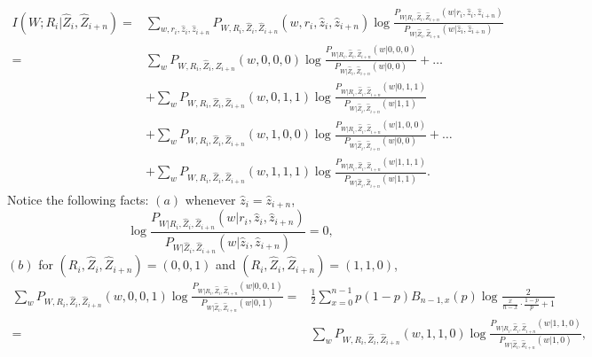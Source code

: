 \documentclass[onecolumn,romanappendices,10pt]{IEEEtran}
\begin{document}
	\begin{equation}
		\begin{aligned}
			I\left( W; R_i | \hat{Z}_{i}, \hat{Z}_{i+n} \right) =& \sum_{w, r_i, \hat{z}_{i}, \hat{z}_{i+n}} P_{W, R_i, \hat{Z}_{i}, \hat{Z}_{i+n}}(w, r_i, \hat{z}_{i}, \hat{z}_{i+n}) \log \frac{P_{W | R_i, \hat{Z}_{i}, \hat{Z}_{i+n}}(w | r_i, \hat{z}_{i}, \hat{z}_{i+n})}{P_{W | \hat{Z}_{i}, \hat{Z}_{i+n}}(w | \hat{z}_{i}, \hat{z}_{i+n})} \\
			=& \sum_{w} P_{W, R_i, \hat{Z}_{i}, \hat{Z}_{i+n}}(w, 0, 0, 0) \log \frac{P_{W | R_i, \hat{Z}_{i}, \hat{Z}_{i+n}}(w | 0, 0, 0)}{P_{W | \hat{Z}_{i}, \hat{Z}_{i+n}}(w | 0, 0)} + \ldots \\
			& + \sum_{w} P_{W, R_i, \hat{Z}_{i}, \hat{Z}_{i+n}}(w, 0, 1, 1) \log \frac{P_{W | R_i, \hat{Z}_{i}, \hat{Z}_{i+n}}(w | 0, 1, 1)}{P_{W | \hat{Z}_{i}, \hat{Z}_{i+n}}(w | 1, 1)} \\
			& + \sum_{w} P_{W, R_i, \hat{Z}_{i}, \hat{Z}_{i+n}}(w, 1, 0, 0) \log \frac{P_{W | R_i, \hat{Z}_{i}, \hat{Z}_{i+n}}(w | 1, 0, 0)}{P_{W | \hat{Z}_{i}, \hat{Z}_{i+n}}(w | 0, 0)} + \ldots \\
			& + \sum_{w} P_{W, R_i, \hat{Z}_{i}, \hat{Z}_{i+n}}(w, 1, 1, 1) \log \frac{P_{W | R_i, \hat{Z}_{i}, \hat{Z}_{i+n}}(w | 1, 1, 1)}{P_{W | \hat{Z}_{i}, \hat{Z}_{i+n}}(w | 1, 1)}.
		\end{aligned}
		\label{eq:ICIMI_cal}
	\end{equation}
	Notice the following facts: $(a)$ whenever $\hat{z}_{i} = \hat{z}_{i+n}$,
	\begin{equation*}
		\log \frac{P_{W | R_i, \hat{Z}_{i}, \hat{Z}_{i+n}}(w | r_i, \hat{z}_{i}, \hat{z}_{i+n})}{P_{W | \hat{Z}_{i}, \hat{Z}_{i+n}}(w | \hat{z}_{i}, \hat{z}_{i+n})} = 0,
	\end{equation*}
	$(b)$ for $(R_i, \hat{Z}_{i}, \hat{Z}_{i+n}) = (0,0,1)$ and $(R_i, \hat{Z}_{i}, \hat{Z}_{i+n}) = (1,1,0)$,
	\begin{equation}
		\begin{aligned}
			\sum_{w} P_{W, R_i, \hat{Z}_{i}, \hat{Z}_{i+n}}(w, 0, 0, 1) \log \frac{P_{W | R_i, \hat{Z}_{i}, \hat{Z}_{i+n}}(w | 0, 0, 1)}{P_{W | \hat{Z}_{i}, \hat{Z}_{i+n}}(w | 0, 1)} =& \frac{1}{2} \sum_{x = 0}^{n - 1} p(1-p) B_{n-1,x}(p) \log \frac{2}{\frac{x}{n - x} \cdot \frac{1 - p}{p} + 1} \\
			=& \sum_{w} P_{W, R_i, \hat{Z}_{i}, \hat{Z}_{i+n}}(w, 1, 1, 0) \log \frac{P_{W | R_i, \hat{Z}_{i}, \hat{Z}_{i+n}}(w | 1, 1, 0)}{P_{W | \hat{Z}_{i}, \hat{Z}_{i+n}}(w | 1, 0)},
		\end{aligned}
	\end{equation}
\end{document}
